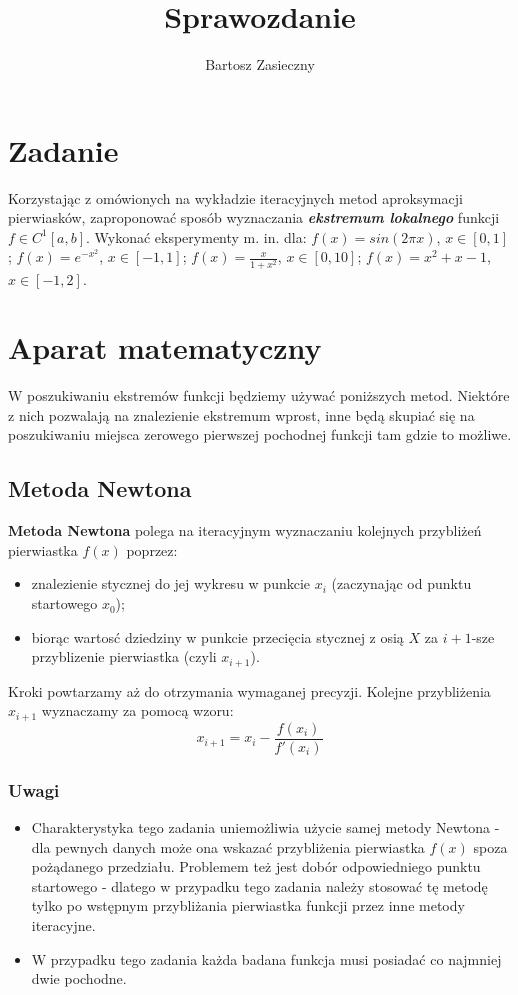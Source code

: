 \documentclass[a4paper,11pt]{article}
\title{Sprawozdanie}
\author{Bartosz Zasieczny}
\begin{document}
\maketitle
\tableofcontents

\section{Zadanie}
Korzystając z omówionych na wykładzie iteracyjnych metod aproksymacji pierwiasków, zaproponować sposób wyznaczania \textbf{\emph{ekstremum lokalnego}} funkcji \( f \in C^1[a,b] \). Wykonać eksperymenty m. in. dla: \( f(x) = sin(2 \pi x) \), \( x \in [0,1] \); \( f(x) = e^{-x^2} \), \( x \in [-1, 1] \); \( f(x) = \frac {x} {1+x^2} \), \( x \in [0,10] \); \( f(x) = x^2 + x - 1 \), \( x \in [-1,2] \).

\section{Aparat matematyczny}
  W poszukiwaniu ekstremów funkcji będziemy używać poniższych metod. Niektóre z nich pozwalają na znalezienie ekstremum wprost, inne będą skupiać się na poszukiwaniu miejsca zerowego pierwszej pochodnej funkcji tam gdzie to możliwe.
  \subsection{Metoda Newtona}
  \textbf{Metoda Newtona} polega na iteracyjnym wyznaczaniu kolejnych przybliżeń pierwiastka \( f(x) \) poprzez: 
  \begin{itemize}
    \item znalezienie stycznej do jej wykresu w punkcie \(x_i\) (zaczynając od punktu startowego \(x_0\)); 
    \item biorąc wartosć dziedziny w punkcie przecięcia stycznej z osią \(X\) za \(i+1\)-sze przyblizenie pierwiastka (czyli \( x_{i+1} \)).
  \end{itemize}
  Kroki powtarzamy aż do otrzymania wymaganej precyzji.
  Kolejne przybliżenia \( x_{i+1} \) wyznaczamy za pomocą wzoru:
  $$ x_{i+1} = x_i - \frac {f(x_i)} {f'(x_i)} $$
  \subsubsection{Uwagi}
  
  \begin{itemize}
    \item Charakterystyka tego zadania uniemożliwia użycie samej metody Newtona - dla pewnych danych może ona wskazać przybliżenia pierwiastka \( f(x) \) spoza pożądanego przedziału. Problemem też jest dobór odpowiedniego punktu startowego - dlatego w przypadku tego zadania należy stosować tę metodę tylko po wstępnym przybliżania pierwiastka funkcji przez inne metody iteracyjne.
    \item W przypadku tego zadania każda badana funkcja musi posiadać co najmniej dwie pochodne.
  \end{itemize}
  
\end{document}
